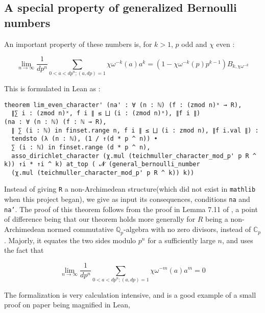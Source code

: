 \documentclass[a4paper,UKenglish,cleveref, autoref, thm-restate]{lipics-v2021}
\newcommand{\lean}[1]{\texttt{#1}\xspace} %
\begin{document}
\subsection{A special property of generalized Bernoulli numbers}
An important property of these numbers is, for $k > 1$, $p$ odd and $\chi$ even : 
\begin{theorem}\label{thm1}
$$ \lim_{n \to \infty} \frac{1}{dp^{n}} \sum_{0 < a < dp^{n} ; (a, dp) = 1} \chi \omega^{-k} (a) a^{k} = 
(1 - \chi \omega^{-k} (p) p^{k-1}) B_{k, \chi \omega^{-k}} $$
\end{theorem} 
This is formulated in Lean as :
\begin{lstlisting}
theorem lim_even_character' (na' : ∀ (n : ℕ) (f : (zmod n)ˣ → R), 
  ∥∑ i : (zmod n)ˣ, f i ∥ ≤ ⨆ (i : (zmod n)ˣ), ∥f i ∥)
(na : ∀ (n : ℕ) (f : ℕ → R), 
  ∥ ∑ (i : ℕ) in finset.range n, f i ∥ ≤ ⨆ (i : zmod n), ∥f i.val ∥) : 
  tendsto (λ (n : ℕ), (1 / ↑(d * p ^ n)) • 
  ∑ (i : ℕ) in finset.range (d * p ^ n),
  asso_dirichlet_character (χ.mul (teichmuller_character_mod_p' p R ^ k)) ↑i * ↑i ^ k) at_top ( 𝓝 (general_bernoulli_number 
  (χ.mul (teichmuller_character_mod_p' p R ^ k)) k))
\end{lstlisting}
Instead of giving \lean{R} a non-Archimedean structure(which did not exist in \lean{mathlib} when this project began), 
we give as input its consequences, conditions \lean{na} and \lean{na'}. 
The proof of this theorem follows from the proof in Lemma 7.11 of \cite{cyc}, a 
point of difference being that our theorem holds more generally for $R$ being a non-Archimedean normed commutative $\mathbb{Q}_p$-algebra with no zero divisors, 
instead of $\mathbb{C}_p$. Majorly, it equates the two sides modulo $p^n$ for a 
sufficiently large $n$, and uses the fact that 
\begin{theorem}\label{thm2}
  $$ \lim_{n \to \infty} \frac{1}{dp^{n}} \sum_{0 < a < dp^{n} ; (a, dp) = 1} \chi \omega^{-m} (a) a^{m} = 0 $$
\end{theorem}
The formalization is very calculation intensive, and is a good example of a small proof on paper being magnified in Lean, 
\end{document}
